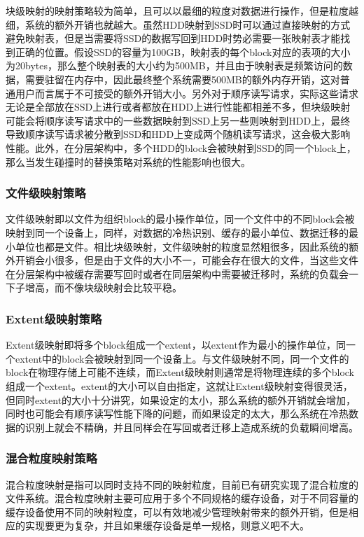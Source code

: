 块级映射的映射策略较为简单，且可以以最细的粒度对数据进行操作，但是粒度越细，系统的额外开销也就越大。虽然HDD映射到SSD时可以通过直接映射的方式避免映射表，但是当需要将SSD的数据写回到HDD时势必需要一张映射表才能找到正确的位置。假设SSD的容量为100GB，映射表的每个block对应的表项的大小为20bytes，那么整个映射表的大小约为500MB，并且由于映射表是频繁访问的数据，需要驻留在内存中，因此最终整个系统需要500MB的额外内存开销，这对普通用户而言属于不可接受的额外开销大小。另外对于顺序读写请求，实际这些请求无论是全部放在SSD上进行或者都放在HDD上进行性能都相差不多，但块级映射可能会将顺序读写请求中的一些数据映射到SSD上另一些则映射到HDD上，最终导致顺序读写请求被分散到SSD和HDD上变成两个随机读写请求，这会极大影响性能。此外，在分层架构中，多个HDD的block会被映射到SSD的同一个block上，那么当发生碰撞时的替换策略对系统的性能影响也很大。

\subsubsection{文件级映射策略}

文件级映射即以文件为组织block的最小操作单位，同一个文件中的不同block会被映射到同一个设备上，同样，对数据的冷热识别、缓存的最小单位、数据迁移的最小单位也都是文件。相比块级映射，文件级映射的粒度显然粗很多，因此系统的额外开销会小很多，但是由于文件的大小不一，可能会存在很大的文件，当这些文件在分层架构中被缓存需要写回时或者在同层架构中需要被迁移时，系统的负载会一下子增高，而不像块级映射会比较平稳。

\subsubsection{Extent级映射策略}

Extent级映射即将多个block组成一个extent，以extent作为最小的操作单位，同一个extent中的block会被映射到同一个设备上。与文件级映射不同，同一个文件的block在物理存储上可能不连续，而Extent级映射则通常是将物理连续的多个block组成一个extent。extent的大小可以自由指定，这就让Extent级映射变得很灵活，但同时extent的大小十分讲究，如果设定的太小，那么系统的额外开销就会增加，同时也可能会有顺序读写性能下降的问题，而如果设定的太大，那么系统在冷热数据的识别上就会不精确，并且同样会在写回或者迁移上造成系统的负载瞬间增高。

\subsubsection{混合粒度映射策略}

混合粒度映射是指可以同时支持不同的映射粒度，目前已有研究实现了混合粒度的文件系统\cite{何耀2016面向}。混合粒度映射主要可应用于多个不同规格的缓存设备，对于不同容量的缓存设备使用不同的映射粒度，可以有效地减少管理映射带来的额外开销，但是相应的实现要更为复杂，并且如果缓存设备是单一规格，则意义吧不大。

